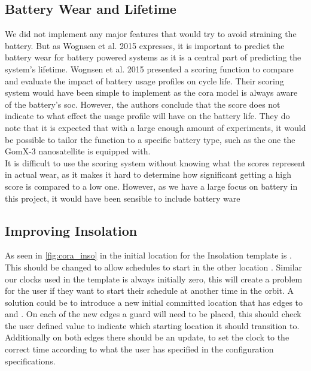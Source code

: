 \subsection*{Battery Wear and Lifetime} \label{subsec:disc_life}
We did not implement any major features that would try to avoid straining the battery. 
But as Wognsen et al. 2015\cite{score_function} expresses, it is important to predict the battery wear for battery powered systems as it is a central part of predicting the system's lifetime.
Wognsen et al. 2015\cite{score_function} presented a scoring function to compare and evaluate the impact of battery usage profiles on cycle life. Their scoring system would have been simple to implement as the \gls{cora} model is always aware of the battery's \gls{soc}. However, the authors conclude that the score does not indicate to what effect the usage profile will have on the battery life. They do note that it is expected that with a large enough amount of experiments, it would be possible to tailor the function to a specific battery type, such as the one the GomX-3 nanosatellite is equipped with. \\
It is difficult to use the scoring system without knowing what the scores represent in actual wear, as it makes it hard to determine how significant getting a high score is compared to a low one. However, as we have a large focus on battery in this project, it would have been sensible to include battery ware


\subsection*{Improving Insolation}
As seen in \cref{fig:cora_inso} in  the initial location for the Insolation template is . This should be changed to allow schedules to start in the other location . Similar our clocks used in the template is always initially zero, this will create a problem for the user if they want to start their schedule at another time in the orbit. A solution could be to introduce a new initial committed location that has edges to  and . On each of the new edges a guard will need to be placed, this should check the user defined value to indicate which starting location it should transition to. Additionally on both edges there should be an update, to set the clock to the correct time according to what the user has specified in the configuration specifications.

